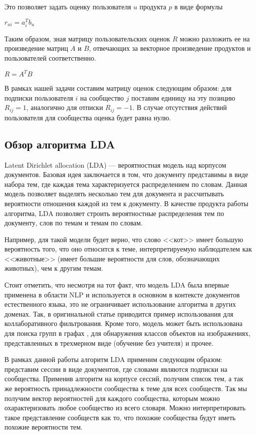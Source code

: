 \documentclass[times,specification,annotation]{itmo-student-thesis}
\begin{document}
Это позволяет задать оценку пользователя $u$ продукта $p$ в виде формулы

$r_{ui} = a_{i}^{T}b_{u}$

Таким образом, зная матрицу пользовательских оценок $R$ можно разложить ее на произведение матриц $A$ и $B$, отвечающих за векторное произведение продуктов и пользователей соответственно.

$R = A^TB$

В рамках нашей задачи составим матрицу оценок следующим образом: для подписки пользователя $i$ на сообщество $j$ поставим единицу на эту позицию $R_{ij} = 1$, аналогично для отписки $R_{ij} = - 1$. В случае отсутствия действий пользователя для сообщества оценка будет равна нулю.


\subsection{Обзор алгоритма LDA}\label{sec:lda}

Latent Dirichlet allocation (LDA) \cite{lda2003} --- вероятностная модель над корпусом документов. Базовая идея заключается в том, что документу представимы в виде набора тем, где каждая тема характеризуется распределением по словам. Данная модель позволяет выделять несколько тем для документа и рассчитывать вероятности отношения каждой из тем к документу.
В качестве продукта работы алгоритма, LDA позволяет строить вероятностные распределения тем по документу, слов по темам и темам по словам.

Например, для такой модели будет верно, что слово <<кот>> имеет большую вероятность того, что оно относится к теме, интерпретируемую наблюдателем как <<животные>> (имеет большие вероятности для слов, обозначающих животных), чем к другим темам. 

Стоит отметить, что несмотря на тот факт, что модель LDA была впервые применена в области NLP и используется в основном в контексте документов естественного языка, это не ограничивает использование алгоритма в других доменах. Так, в оригинальной статье \cite{lda2003} приводится пример использования для коллаборативного фильтрования. Кроме того, модель может быть использована для поиска групп в графах \cite{Henderson2009}, для обнаружения классов объектов на изображениях, представленных в трехмерном виде (обучение без учителя) \cite{Endres2009} и прочее.

В рамках данной работы алгоритм LDA применим следующим образом: представим сессии в виде документов, где словами являются подписки на сообщества. Применив алгоритм на корпусе сессий, получим список тем, а так же вероятность принадлежности сообщества к теме для всех сообществ. Так мы получим вектор вероятностей для каждого сообщества, которым можно охарактеризовать любое сообщество из всего словаря. Можно интерпретировать такое представление сообществ как то, что похожие сообщества будут иметь похожие вероятности тем. 
 
\end{document}
